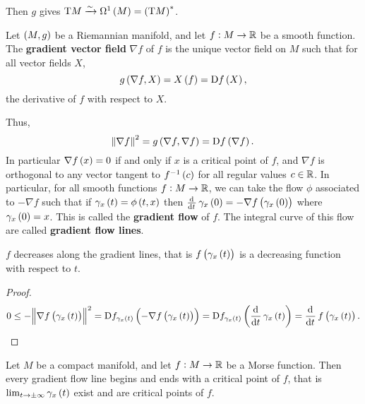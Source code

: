 Then $ g $ gives $ \T M \xrightarrow{\sim} \Omega^1\br{M} = \br{\T M}^* $.

\begin{definition}
Let $ \br{M, g} $ be a Riemannian manifold, and let $ f : M \to \mathbb{R} $ be a smooth function. The \textbf{gradient vector field} $ \nabla f $ of $ f $ is the unique vector field on $ M $ such that for all vector fields $ X $,
$$ g\br{\nabla f, X} = X\br{f} = \D f\br{X}, $$
the derivative of $ f $ with respect to $ X $.
\end{definition}

Thus,
$$ \norm{\nabla f}^2 = g\br{\nabla f, \nabla f} = \D f\br{\nabla f}. $$
In particular $ \nabla f\br{x} = 0 $ if and only if $ x $ is a critical point of $ f $, and $ \nabla f $ is orthogonal to any vector tangent to $ f^{-1}\br{c} $ for all regular values $ c \in \mathbb{R} $. In particular, for all smooth functions $ f : M \to \mathbb{R} $, we can take the flow $ \phi $ associated to $ -\nabla f $ such that if $ \gamma_x\br{t} = \phi\br{t, x} $ then $ \tod{}{t}\gamma_x\br{0} = -\nabla f\br{\gamma_x\br{0}} $ where $ \gamma_x\br{0} = x $. This is called the \textbf{gradient flow} of $ f $. The integral curve of this flow are called \textbf{gradient flow lines}.

\begin{lemma}
$ f $ decreases along the gradient lines, that is $ f\br{\gamma_x\br{t}} $ is a decreasing function with respect to $ t $.
\end{lemma}

\begin{proof}
$$ 0 \le -\norm{\nabla f\br{\gamma_x\br{t}}}^2 = \D f_{\gamma_x\br{t}}\br{-\nabla f\br{\gamma_x\br{t}}} = \D f_{\gamma_x\br{t}}\br{\dod{}{t}\gamma_x\br{t}} = \dod{}{t}f\br{\gamma_x\br{t}}. $$
\end{proof}

\begin{proposition}
Let $ M $ be a compact manifold, and let $ f : M \to \mathbb{R} $ be a Morse function. Then every gradient flow line begins and ends with a critical point of $ f $, that is $ \lim_{t \to \pm\infty} \gamma_x\br{t} $ exist and are critical points of $ f $.
\end{proposition}

\pagebreak

